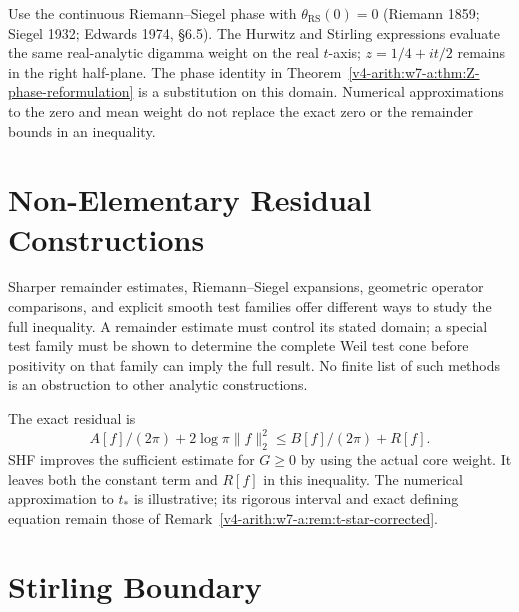 \begin{remark}
\label{v4-arith:w7-a:rem:irreducible-conventions}
Use the continuous Riemann--Siegel phase with
\(\theta_{\mathrm{RS}}(0)=0\) (Riemann 1859; Siegel 1932;
Edwards 1974, \S6.5). The Hurwitz and Stirling expressions evaluate
the same real-analytic digamma weight on the real \(t\)-axis;
\(z=1/4+it/2\) remains in the right half-plane. The phase identity
in Theorem~\ref{v4-arith:w7-a:thm:Z-phase-reformulation} is a
substitution on this domain. Numerical approximations to the zero
and mean weight do not replace the exact zero or the remainder
bounds in an inequality.
\end{remark}

\section{Non-Elementary Residual Constructions}
\label{v4-arith:w7-a:remains-open}

\begin{remark}
\label{v4-arith:w7-a:rem:open-constructions}
Sharper remainder estimates, Riemann--Siegel expansions, geometric
operator comparisons, and explicit smooth test families offer
different ways to study the full inequality. A remainder estimate
must control its stated domain; a special test family must be shown
to determine the complete Weil test cone before positivity on that
family can imply the full result. No finite list of such methods
is an obstruction to other analytic constructions.
\end{remark}

\begin{remark}
\label{v4-arith:w7-a:rem:compare-w6-a}
The exact residual is
\[
 A[f]/(2\pi)+2\log\pi\|f\|_2^2\le B[f]/(2\pi)+R[f].
\]
SHF improves the sufficient estimate for \(G\ge0\) by using the
actual core weight. It leaves both the constant term and \(R[f]\)
in this inequality. The numerical approximation to \(t_*\) is
illustrative; its rigorous interval and exact defining equation
remain those of Remark~\ref{v4-arith:w7-a:rem:t-star-corrected}.
\end{remark}

\section{Stirling Boundary}
\label{v4-arith:w7-a:summary}


